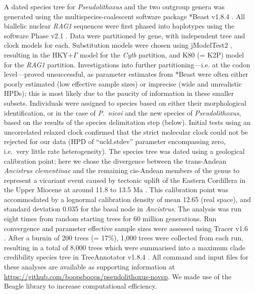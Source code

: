 \documentclass[12pt]{article}
\begin{document}
A dated species tree for \emph{Pseudolithoxus} and the two outgroup genera was generated using the multispecies-coalescent software package *Beast v1.8.4 \citep{Heled2010}. %
All biallelic nuclear \emph{RAG1} sequences were first phased into haplotypes using the software Phase v2.1 \citep{Stephens2003}. %
Data were partitioned by gene, with independent tree and clock models for each. %
Substitution models were chosen using jModelTest2 \citep{Darriba2012}, resulting in the HKY$+\Gamma$ model for the \emph{Cytb} partition, and K80 (= K2P) model for the \emph{RAG1} partition. %
Investigations into further partitioning---i.e. at the codon level---proved unsuccessful, as parameter estimates from *Beast were often either poorly estimated (low effective sample sizes) or imprecise (wide and unrealistic HPDs); this is most likely due to the paucity of information in these smaller subsets. %
Individuals were assigned to species based on either their morphological identification, or in the case of \emph{P}.\ \emph{nicoi} and the new species of \emph{Pseudolithoxus}, based on the results of the species delimitation step (below). %
Initial tests using an uncorrelated relaxed clock confirmed that the strict molecular clock could not be rejected for our data (HPD of ``ucld.stdev'' parameter encompassing zero, i.e.\ very little rate heterogeneity). %
The species tree was dated using a geological calibration point; here we chose the divergence between the trans-Andean \emph{Ancistrus clementinae} and the remaining cis-Andean members of the genus to represent a vicariant event caused by tectonic uplift of the Eastern Cordillera in the Upper Miocene at around 11.8 to 13.5 Ma \citep{Albert2011}. %
This calibration point was accommodated by a lognormal calibration density of mean 12.65 (real space), and standard deviation 0.035 for the basal node in \emph{Ancistrus}. %
The analysis was run eight times from random starting trees for 60 million generations. %
Run convergence and parameter effective sample sizes were assessed using Tracer v1.6 \citet{Rambaut2014}. %
After a burnin of 200 trees (= 17\%), 1,000 trees were collected from each run, resulting in a total of 8,000 trees which were summarised into a maximum clade credibility species tree in TreeAnnotator v1.8.4 \citep{Rambaut2016}. %
All command and input files for these analyses are available as supporting information at \href{https://github.com/boopsboops/pseudolithoxus-novsp}{https://github.com/boopsboops/pseudolithoxus-novsp}. %
We made use of the Beagle library \citep{Ayres2012} to increase computational efficiency.%
\end{document}
